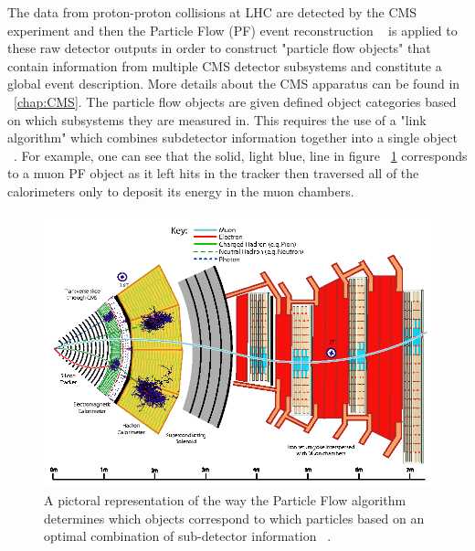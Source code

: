 The data from proton-proton collisions at LHC are detected by the CMS experiment and then the Particle Flow (PF) event reconstruction ~\cite{Sirunyan:2017ulk} is applied to these raw detector outputs in order to construct "particle flow objects" that contain information from multiple CMS detector subsystems and constitute a global event description. More details about the CMS apparatus can be found in ~\ref{chap:CMS}. The particle flow objects are given defined object categories based on which subsystems they are measured in. This requires the use of a "link algorithm" which combines subdetector information together into a single object ~\cite{Sirunyan:2017ulk}. For example, one can see that the solid, light blue, line in figure ~\ref{fig:cmsPF} corresponds to a muon PF object as it left hits in the tracker then traversed all of the calorimeters only to deposit its energy in the muon chambers.


\begin{figure}[htb]
\centering
\includegraphics[width=1.0\textwidth]{Chapter-1/cmsPflow.png}
\caption{A pictoral representation of the way the Particle Flow algorithm determines which objects correspond to which particles based on an optimal combination of sub-detector information ~\cite{Sirunyan:2017ulk}.}
\label{fig:cmsPF}
\end{figure}


